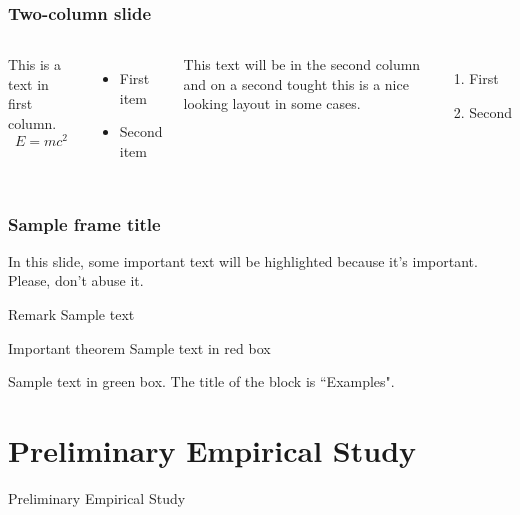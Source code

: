 \documentclass[aspectratio=169,t]{beamer}
\begin{document}
\begin{frame}
\frametitle{Two-column slide}

\begin{columns}

This is a text in first column.
$$E=mc^2$$
\begin{itemize}
\item First item
\item Second item
\end{itemize}

This text will be in the second column
and on a second tought this is a nice looking
layout in some cases.
\begin{enumerate}
    \item First
    \item Second
\end{enumerate}
\end{columns}
\end{frame}


\begin{frame}
\frametitle{Sample frame title}

In this slide, some important text will be
\alert{highlighted} because it's important.
Please, don't abuse it.

\begin{block}{Remark}
Sample text
\end{block}

\begin{alertblock}{Important theorem}
Sample text in red box
\end{alertblock}

\begin{examples}
Sample text in green box. The title of the block is ``Examples".
\end{examples}
\end{frame}




\section{Preliminary Empirical Study}

\begin{frame}{Preliminary Empirical Study}
\end{frame}
\end{document}
